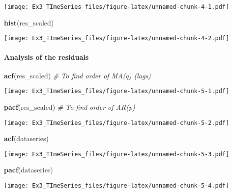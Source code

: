 \documentclass[]{article}
\newenvironment{Shaded}{\begin{snugshade}}{\end{snugshade}}
\newcommand{\KeywordTok}[1]{\textcolor[rgb]{0.13,0.29,0.53}{\textbf{#1}}}
\newcommand{\CommentTok}[1]{\textcolor[rgb]{0.56,0.35,0.01}{\textit{#1}}}
\newcommand{\NormalTok}[1]{#1}
\let\oldparagraph\paragraph
\renewcommand{\paragraph}[1]{\oldparagraph{#1}\mbox{}}
\begin{document}
\texttt{[image: Ex3\_TImeSeries\_files/figure-latex/unnamed-chunk-4-1.pdf]}

\begin{Shaded}
\begin{Highlighting}[]
\KeywordTok{hist}\NormalTok{(res_scaled)}
\end{Highlighting}
\end{Shaded}

\texttt{[image: Ex3\_TImeSeries\_files/figure-latex/unnamed-chunk-4-2.pdf]}

\paragraph{Analysis of the residuals}\label{analysis-of-the-residuals}

\begin{Shaded}
\begin{Highlighting}[]
\KeywordTok{acf}\NormalTok{(res_scaled) }\CommentTok{# To find order of MA(q) (lags)}
\end{Highlighting}
\end{Shaded}

\texttt{[image: Ex3\_TImeSeries\_files/figure-latex/unnamed-chunk-5-1.pdf]}

\begin{Shaded}
\begin{Highlighting}[]
\KeywordTok{pacf}\NormalTok{(res_scaled) }\CommentTok{# To find order of AR(p)}
\end{Highlighting}
\end{Shaded}

\texttt{[image: Ex3\_TImeSeries\_files/figure-latex/unnamed-chunk-5-2.pdf]}

\begin{Shaded}
\begin{Highlighting}[]
\KeywordTok{acf}\NormalTok{(dataseries)}
\end{Highlighting}
\end{Shaded}

\texttt{[image: Ex3\_TImeSeries\_files/figure-latex/unnamed-chunk-5-3.pdf]}

\begin{Shaded}
\begin{Highlighting}[]
\KeywordTok{pacf}\NormalTok{(dataseries)}
\end{Highlighting}
\end{Shaded}

\texttt{[image: Ex3\_TImeSeries\_files/figure-latex/unnamed-chunk-5-4.pdf]}
\end{document}
